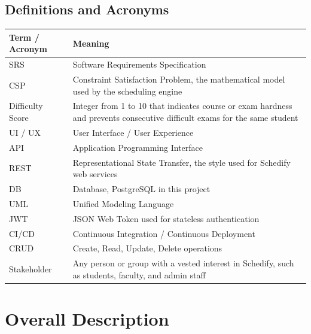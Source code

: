 \documentclass[11pt]{report}
\begin{document}
\section{Definitions and Acronyms}
\begin{longtable}{p{}p{}}
\toprule
\textbf{Term / Acronym} & \textbf{Meaning} \\
\midrule
SRS & Software Requirements Specification \\
CSP & Constraint Satisfaction Problem, the mathematical model used by the scheduling engine \\
Difficulty Score & Integer from 1 to 10 that indicates course or exam hardness and prevents consecutive difficult exams for the same student \\
UI / UX & User Interface / User Experience \\
API & Application Programming Interface \\
REST & Representational State Transfer, the style used for Schedify web services \\
DB & Database, PostgreSQL in this project \\
UML & Unified Modeling Language \\
JWT & JSON Web Token used for stateless authentication \\
CI/CD & Continuous Integration / Continuous Deployment \\
CRUD & Create, Read, Update, Delete operations \\
Stakeholder & Any person or group with a vested interest in Schedify, such as students, faculty, and admin staff \\
\bottomrule
\end{longtable}

\chapter{Overall Description}
\end{document}
